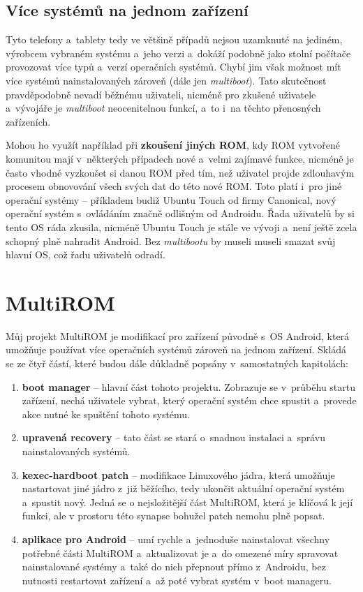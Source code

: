\documentclass[12pt, a4paper, oneside]{article}
\newcommand{\B}{\textbf} %
\newcommand{\It}{\textit}  %
\begin{document}
\subsection{Více systémů na jednom zařízení}
Tyto telefony a~tablety tedy ve většině případů nejsou uzamknuté na jediném, výrobcem vybraném systému a~jeho verzi a~dokáží podobně jako stolní počítače provozovat více typů a~verzí operačních systémů. Chybí jim však možnost mít více systémů nainstalovaných zároveň (dále jen \It{multiboot}). Tato skutečnost pravděpodobně nevadí běžnému uživateli, nicméně pro zkušené uživatele a~vývojáře je \It{multiboot} neocenitelnou funkcí, a~to i~na těchto přenosných zařízeních.

Mohou ho využít například při \B{zkoušení jiných ROM}, kdy ROM vytvořené komunitou mají v~některých případech nové a~velmi zajímavé funkce, nicméně je často vhodné vyzkoušet si danou ROM před tím, než uživatel projde zdlouhavým procesem obnovování všech svých dat do této nové ROM. Toto platí i~pro jiné operační systémy -- příkladem budiž Ubuntu Touch od firmy Canonical, nový operační systém s~ovládáním značně odlišným od Androidu. Řada uživatelů by si tento OS ráda zkusila, nicméně Ubuntu Touch je stále ve vývoji a~není ještě zcela schopný plně nahradit Android. Bez \It{multibootu} by museli museli smazat svůj hlavní OS, což řadu uživatelů odradí.

\section{MultiROM}
Můj projekt MultiROM je modifikací pro zařízení původně s~OS Android, která umožňuje používat více operačních systémů zároveň na jednom zařízení. Skládá se ze čtyř částí, které budou dále důkladně popsány v~samostatných kapitolách:

\begin{enumerate}
    \item \B{boot manager} -- hlavní část tohoto projektu. Zobrazuje se v~průběhu startu zařízení, nechá uživatele vybrat, který operační systém chce spustit a~provede akce nutné ke spuštění tohoto systému.
    \item \B{upravená recovery} -- tato část se stará o~snadnou instalaci a~správu nainstalovaných systémů.
    \item \B{kexec-hardboot patch} -- modifikace Linuxového jádra, která umožňuje nastartovat jiné jádro z~již běžícího, tedy ukončit aktuální operační systém a~spustit nový. Jedná se o nejsložitější část MultiROM, která je klíčová k její funkci, ale v prostoru této synapse bohužel patch nemohu plně popsat.
    \item \B{aplikace pro Android} -- umí rychle a~jednoduše nainstalovat všechny potřebné části MultiROM a~aktualizovat je a~do omezené míry spravovat nainstalované systémy a~také do nich přepnout přímo z~Androidu, bez nutnosti restartovat zařízení a~až poté vybrat systém v~boot manageru.
\end{enumerate}
\end{document}
